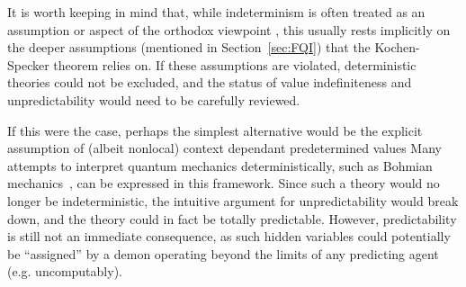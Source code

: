 \documentclass[%
 superscriptaddress,
 preprint,
 showpacs,
 showkeys,
 preprintnumbers,
  amsmath,amssymb,
  aps,
 pra,
  longbibliography,
  floatfix,
 ]{revtex4-1}
\theoremstyle{definition}
\begin{document}
It is worth keeping in mind that, while indeterminism is often treated as an assumption or aspect of the orthodox viewpoint \cite{born-26-1,zeil-05_nature_ofQuantum}, this usually rests implicitly on the deeper assumptions (mentioned in
Section~\ref{sec:FQI})  that the Kochen-Specker theorem relies on.
If these assumptions are violated, deterministic theories could not be excluded, and the status of value indefiniteness and unpredictability would need to be carefully reviewed.


If this were the case, perhaps the simplest alternative would be the explicit assumption of (albeit nonlocal) context dependant predetermined values
{\color{green}Many} attempts to interpret quantum mechanics deterministically, such as Bohmian mechanics~\cite{Bohm52}, can be expressed in this framework.
Since such a theory would no longer be indeterministic, the intuitive argument for unpredictability would break down, and the theory could in fact be totally predictable.
However, predictability is still not an immediate consequence, as such hidden variables could potentially be ``assigned'' by a demon operating beyond the limits of any predicting agent (e.g. uncomputably).
\end{document}
